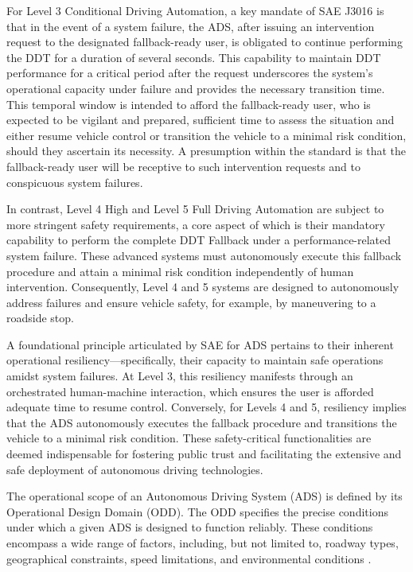 For Level 3 Conditional Driving Automation, a key mandate of SAE J3016 \cite{sae:j3016:2021apr} is that in the event of a system failure, the ADS, after issuing an intervention request to the designated fallback-ready user, is obligated to continue performing the DDT for a duration of several seconds. This capability to maintain DDT performance for a critical period after the request underscores the system's operational capacity under failure and provides the necessary transition time. This temporal window is intended to afford the fallback-ready user, who is expected to be vigilant and prepared, sufficient time to assess the situation and either resume vehicle control or transition the vehicle to a minimal risk condition, should they ascertain its necessity. A presumption within the standard is that the fallback-ready user will be receptive to such intervention requests and to conspicuous system failures.

In contrast, Level 4 High and Level 5 Full Driving Automation are subject to more stringent safety requirements, a core aspect of which is their mandatory capability to perform the complete DDT Fallback under a performance-related system failure. These advanced systems must autonomously execute this fallback procedure and attain a minimal risk condition independently of human intervention. Consequently, Level 4 and 5 systems are designed to autonomously address failures and ensure vehicle safety, for example, by maneuvering to a roadside stop.

A foundational principle articulated by SAE for ADS pertains to their inherent operational resiliency—specifically, their capacity to maintain safe operations amidst system failures. At Level 3, this resiliency manifests through an orchestrated human-machine interaction, which ensures the user is afforded adequate time to resume control. Conversely, for Levels 4 and 5, resiliency implies that the ADS autonomously executes the fallback procedure and transitions the vehicle to a minimal risk condition. These safety-critical functionalities are deemed indispensable for fostering public trust and facilitating the extensive and safe deployment of autonomous driving technologies.


The operational scope of an Autonomous Driving System (ADS) is defined by its Operational Design Domain (ODD). The ODD specifies the precise conditions under which a given ADS is designed to function reliably. These conditions encompass a wide range of factors, including, but not limited to, roadway types, geographical constraints, speed limitations, and environmental conditions \cite{sae:j3016:2021apr}.

